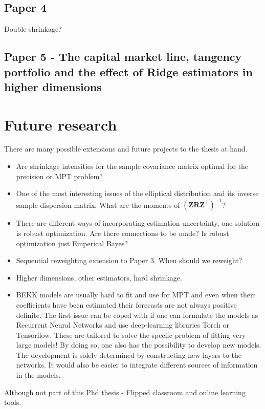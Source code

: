 \documentclass[]{book}\usepackage{knitr}
\begin{document}
\section*{Paper 4}
Double shrinkage?

\section*{Paper 5 - The capital market line, tangency portfolio and the effect of Ridge estimators in higher dimensions}
\chapter{Future research}\label{ch:future}

There are many possible extensions and future projects to the thesis at hand.

\begin{itemize}
	\item Are shrinkage intensities for the sample covariance matrix optimal for the precision or MPT problem? 
	\item One of the most interesting issues of the elliptical distribution and its inverse sample dispersion matrix. What are the moments of $(\mathbf{Z} \mathbf{R} \mathbf{Z}^\top)^{-1}$?
	\item There are different ways of incorporating estimation uncertainty, one solution is robust optimization. Are there connections to be made? Is robust optimization just Emperical Bayes?
	\item Sequential reweighting extension to Paper 3. When should we reweight?
	\item Higher dimensions, other estimators, hard shrinkage.
	\item BEKK models are usually hard to fit and use for MPT and even when their coefficients have been estimated their forecasts are not always positive definite. The first issue can be coped with if one can formulate the models as Recurrent Neural Networks and use deep-learning libraries Torch or Tensorflow. These are tailored to solve the specifc problem of fitting very large models! By doing so, one also has the possibility to develop new models. The development is solely determined by constructing new layers to the networks. It would also be easier to integrate different sources of information in the models.
\end{itemize}

Although not part of this Phd thesis - Flipped classroom and online learning tools.


\end{document}
